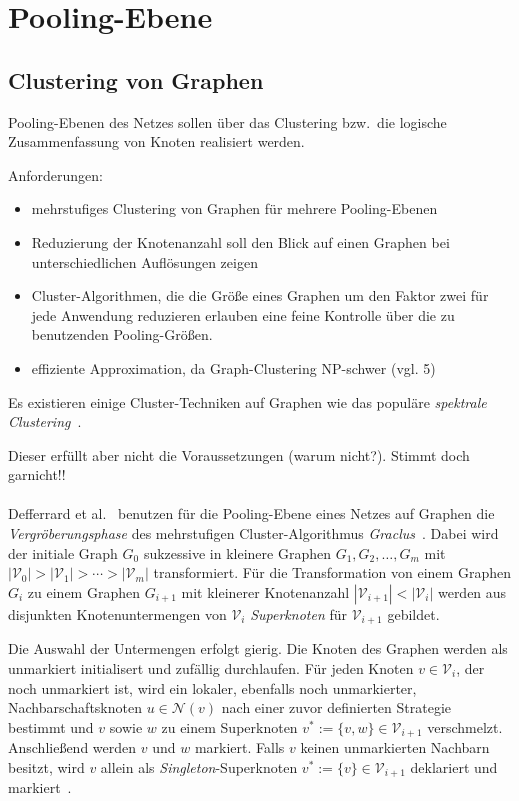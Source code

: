 \section{Pooling-Ebene}


\subsection{Clustering von Graphen}

Pooling-Ebenen des Netzes sollen über das Clustering bzw.\ die logische Zusammenfassung von Knoten realisiert werden.

Anforderungen:

\begin{itemize}
  \item mehrstufiges Clustering von Graphen für mehrere Pooling-Ebenen
  \item Reduzierung der Knotenanzahl soll den Blick auf einen Graphen bei unterschiedlichen Auflösungen zeigen
  \item Cluster-Algorithmen, die die Größe eines Graphen um den Faktor zwei für jede Anwendung reduzieren erlauben eine feine Kontrolle über die zu benutzenden Pooling-Größen.
  \item effiziente Approximation, da Graph-Clustering NP-schwer (vgl. 5)
\end{itemize}

Es existieren einige Cluster-Techniken auf Graphen wie das populäre \emph{spektrale Clustering}~\cite{Luxburg}. 

Dieser erfüllt aber nicht die Voraussetzungen (warum nicht?). Stimmt doch garnicht!!\\
\\

Defferrard et al.~\cite{Defferrard} benutzen für die Pooling-Ebene eines Netzes auf Graphen die \emph{Vergröberungsphase} des mehrstufigen Cluster-Algorithmus \emph{Graclus}~\cite{Dhillon}.
Dabei wird der initiale Graph $G_0$ sukzessive in kleinere Graphen $G_1, G_2, \ldots, G_m$ mit $|\mathcal{V}_0| > |\mathcal{V}_1| > \cdots > |\mathcal{V}_m|$ transformiert.
Für die Transformation von einem Graphen $G_i$ zu einem Graphen $G_{i+1}$ mit kleinerer Knotenanzahl $|\mathcal{V}_{i+1}| < |\mathcal{V}_i|$ werden aus disjunkten Knotenuntermengen von $\mathcal{V}_i$ \emph{Superknoten} für $\mathcal{V}_{i+1}$ gebildet.

Die Auswahl der Untermengen erfolgt gierig.
Die Knoten des Graphen werden als unmarkiert initialisert und zufällig durchlaufen.
Für jeden Knoten $v \in \mathcal{V}_i$, der noch unmarkiert ist, wird ein lokaler, ebenfalls noch unmarkierter, Nachbarschaftsknoten $u \in \mathcal{N}(v)$ nach einer zuvor definierten Strategie bestimmt und $v$ sowie $w$ zu einem Superknoten $v^* := \lbrace v, w \rbrace \in \mathcal{V}_{i+1}$ verschmelzt.
Anschließend werden $v$ und $w$ markiert.
Falls $v$ keinen unmarkierten Nachbarn besitzt, wird $v$ allein als \emph{Singleton}-Superknoten $v^* := \lbrace v \rbrace \in \mathcal{V}_{i+1}$ deklariert und markiert~\cite{Dhillon}.

